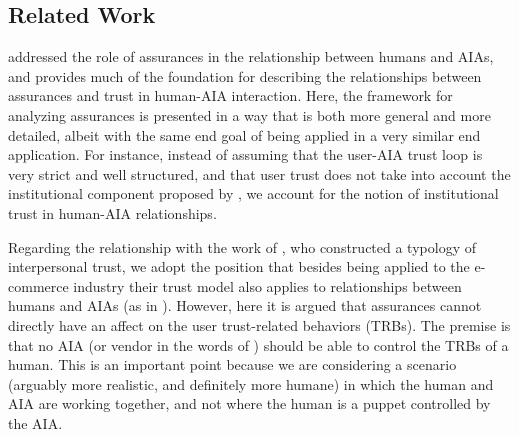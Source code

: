 \subsection{Related Work}\label{sec:rel_work}
    \citet{Lillard2016-yg} addressed the role of assurances in the relationship between humans and AIAs, and provides much of the foundation for describing the relationships between assurances and trust in human-AIA interaction. Here, the framework for analyzing assurances is presented in a way that is both more general and more detailed, albeit with the same end goal of being applied in a very similar end application. For instance, instead of assuming that the user-AIA trust loop is very strict and well structured, and that user trust does not take into account the institutional component proposed by \citet{McKnight2001-fa}, we account for the notion of institutional trust in  human-AIA relationships.

    Regarding the relationship with the work of \citet{McKnight2001-fa}, who constructed a typology of interpersonal trust,  we adopt the position that besides being applied to the e-commerce industry their trust model also applies to relationships between humans and AIAs (as in \citet{Lillard2016-yg}). However, here it is argued that assurances cannot directly have an affect on the user trust-related behaviors (TRBs). The premise is that no AIA (or vendor in the words of \citeauthor{McKnight2001-fa}) should be able to control the TRBs of a human. This is an important point because we are considering a scenario (arguably more realistic, and definitely more humane) in which the human and AIA are working together, and not where the human is a puppet controlled by the AIA.





